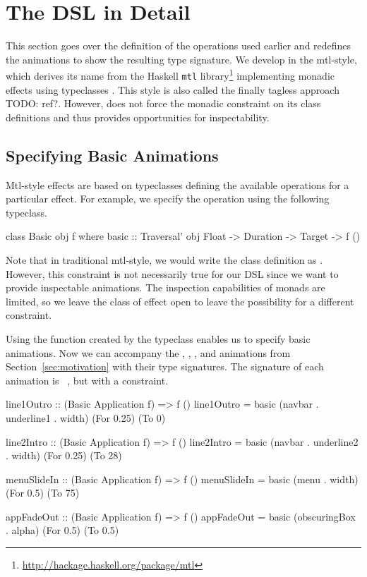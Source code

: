 \section{The DSL in Detail}
\label{sec:detail}

This section goes over the definition of the operations used earlier and redefines the animations to show the resulting type signature. We develop \dsl{} in the mtl-style, which derives its name from the Haskell \texttt{mtl} library\footnote{\url{http://hackage.haskell.org/package/mtl}} implementing monadic effects using typeclasses \cite{DBLP:conf/afp/Jones95}. This style is also called the finally tagless approach TODO: ref?. However, \dsl{} does not force the monadic constraint on its class definitions and thus provides opportunities for inspectability.


\subsection{Specifying Basic Animations}

Mtl-style effects are based on typeclasses defining the available operations for a particular effect. For example, we specify the  operation using the following typeclass.

\begin{code}
class Basic obj f where
  basic :: Traversal' obj Float -> Duration -> Target -> f ()
\end{code}

Note that in traditional mtl-style, we would write the class definition as . However, this constraint is not necessarily true for our DSL since we want to provide inspectable animations. The inspection capabilities of monads are limited, so we leave the class of effect open to leave the possibility for a different constraint.

Using the  function created by the  typeclass enables us to specify basic animations. Now we can accompany the , , , and  animations from Section~\ref{sec:motivation} with their type signatures. The signature of each animation is ~\hs{()}, but with a  constraint.

\begin{code}
line1Outro :: (Basic Application f) => f ()
line1Outro = basic (navbar . underline1 . width) (For 0.25) (To 0)

line2Intro :: (Basic Application f) => f ()
line2Intro = basic (navbar . underline2 . width) (For 0.25) (To 28)

menuSlideIn :: (Basic Application f) => f ()
menuSlideIn = basic (menu . width) (For 0.5) (To 75)

appFadeOut :: (Basic Application f) => f ()
appFadeOut = basic (obscuringBox . alpha) (For 0.5) (To 0.5)
\end{code}

